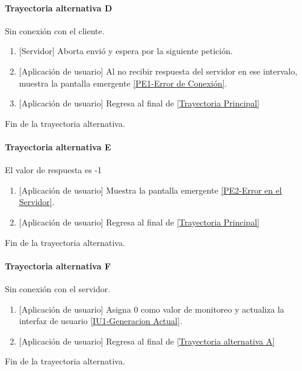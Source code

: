 \paragraph{Trayectoria alternativa D} \label{SUB-U-CU1.5:TD}
	Sin conexión con el cliente.
	\begin{enumerate}[label=D\arabic*.]
		\item {[Servidor]} Aborta envió y espera por la siguiente petición.
		\item {[Aplicación de usuario]} Al no recibir respuesta del servidor en ese intervalo, muestra la pantalla emergente \hyperref[fig:Error de Conexion]{[PE1-Error de Conexión]}.
		\item {[Aplicación de usuario]} Regresa al final de \hyperref[SUB-U-CU1.5:TP]{[Trayectoria Principal]}
	\end{enumerate}
	Fin de la trayectoria alternativa.
	
\paragraph{Trayectoria alternativa E} \label{SUB-U-CU1.5:TE}
	El valor de respuesta es -1
	\begin{enumerate}[label=E\arabic*.]
		\item {[Aplicación de usuario]} Muestra la pantalla emergente \hyperref[fig:Error en el Servidor]{[PE2-Error en el Servidor]}.
		\item {[Aplicación de usuario]} Regresa al final de \hyperref[SUB-U-CU1.5:TP]{[Trayectoria Principal]}
	\end{enumerate}
	Fin de la trayectoria alternativa.
	
\paragraph{Trayectoria alternativa F} \label{SUB-U-CU1.5:TF}
	Sin conexión con el servidor.
	\begin{enumerate}[label=F\arabic*.]
		\item {[Aplicación de usuario]} Asigna 0 como valor de monitoreo y actualiza la interfaz de usuario \hyperref[fig:monitoreo]{[IU1-Generacion Actual]}.
		\item {[Aplicación de usuario]} Regresa al final de \hyperref[SUB-U-CU1.5:TA]{[Trayectoria alternativa A]}
	\end{enumerate}
	Fin de la trayectoria alternativa.
	
